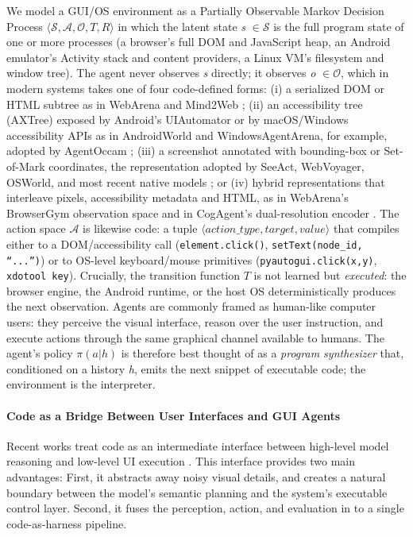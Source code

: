 \documentclass{llmxive}
\begin{document}
We model a GUI/OS environment as a Partially Observable Markov Decision Process $\langle \mathcal{S}, \mathcal{A}, \mathcal{O}, T, R\rangle$ in which the latent state \textit{s} $\in \mathcal{S}$ is the full program state of one or more processes (a browser's full DOM and JavaScript heap, an Android emulator's Activity stack and content providers, a Linux VM's filesystem and window tree). The agent never observes \textit{s} directly; it observes \textit{o} $\in \mathcal{O}$, which in modern systems takes one of four code-defined forms: (i) a serialized DOM or HTML subtree as in WebArena and Mind2Web \citep{zhou2024webarenarealisticwebenvironment,deng2023mind2webgeneralistagentweb}; (ii) an accessibility tree (AXTree) exposed by Android's UIAutomator or by macOS/Windows accessibility APIs as in AndroidWorld and WindowsAgentArena, for example, adopted by AgentOccam \citep{rawles2025androidworlddynamicbenchmarkingenvironment,bonatti2024windowsagentarenaevaluating,yang2024agentoccam}; (iii) a screenshot annotated with bounding-box or Set-of-Mark coordinates, the representation adopted by SeeAct, WebVoyager, OSWorld, and most recent native models \citep{zheng2024gpt4visiongeneralistwebagent,he2024webvoyagerbuildingendtoendweb,xie2024osworldbenchmarkingmultimodalagents,yang2023setofmarkpromptingunleashesextraordinary}; or (iv) hybrid representations that interleave pixels, accessibility metadata and HTML, as in WebArena's BrowserGym observation space and in CogAgent's dual-resolution encoder \citep{drouin2024workarenacapablewebagents,hong2024cogagentvisuallanguagemodel}. The action space $\mathcal{A}$ is likewise code: a tuple $\langle action\_type, target, value\rangle$ that compiles either to a DOM/accessibility call (\texttt{element.click()}, \texttt{setText(node\_id, ``...'')}) or to OS-level keyboard/mouse primitives (\texttt{pyautogui.click(x,y)}, \texttt{xdotool key}). Crucially, the transition function $T$ is not learned but \textit{executed}: the browser engine, the Android runtime, or the host OS deterministically produces the next observation. Agents are commonly framed as human-like computer users: they perceive the visual interface, reason over the user instruction, and execute actions through the same graphical channel available to humans. The agent's policy $\pi(a|h)$ is therefore best thought of as a \textit{program synthesizer} that, conditioned on a history \textit{h}, emits the next snippet of executable code; the environment is the interpreter.


\paragraph{Code as a Bridge Between User Interfaces and GUI Agents} 
Recent works treat code as an intermediate interface between high-level model reasoning and low-level UI execution \citep{xie2024osworldbenchmarkingmultimodalagents, wang2025guiagentsfoundationmodels,
xu2024androidlabtrainingsystematicbenchmarking}. This interface provides two main advantages: First, it abstracts away noisy visual details, and creates a natural boundary between the model's semantic planning and the system's executable control layer. Second, it fuses the perception, action, and evaluation in to a single code-as-harness pipeline.
\end{document}
